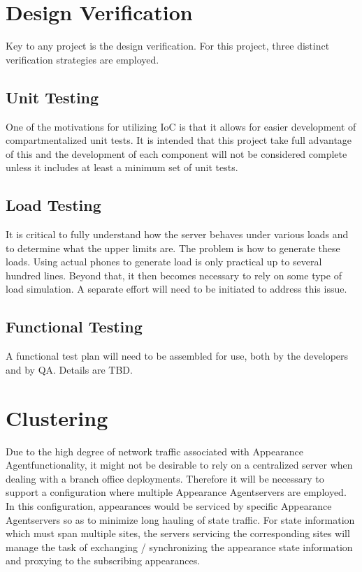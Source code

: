 \documentclass[twoside,11pt]{article}
\newcommand{\PAA}{Appearance Agent\space}
\begin{document}
\section{Design Verification}
Key to any project is the design verification.  For this project, three
distinct verification strategies are employed.

\subsection{Unit Testing}
One of the motivations for utilizing IoC is that it allows for easier development of
compartmentalized unit tests.  It is intended that this project take full advantage of this and the
development of each component will not be considered complete unless it includes at least a minimum
set of unit tests.

\subsection{Load Testing}
It is critical to fully understand how the server behaves under various loads and to determine what
the upper limits are.  The problem is how to generate these loads.  Using actual phones to generate
load is only practical up to several hundred lines.  Beyond that, it then becomes necessary to rely
on some type of load simulation.  A separate effort will need to be initiated to address this issue.

\subsection{Functional Testing}
A functional test plan will need to be assembled for use, both by the developers and by QA.  Details
are TBD.

\section{Clustering}
Due to the high degree of network traffic associated with \PAA functionality, it might not be
desirable to rely on a centralized server when dealing with a branch office deployments.  Therefore
it will be necessary to support a configuration where multiple \PAA servers are employed.  In this
configuration, appearances would be serviced by specific \PAA servers so as to minimize long hauling
of state traffic.  For state information which must span multiple sites, the servers servicing the
corresponding sites will manage the task of exchanging / synchronizing the appearance state
information and proxying to the subscribing appearances.
\end{document}
